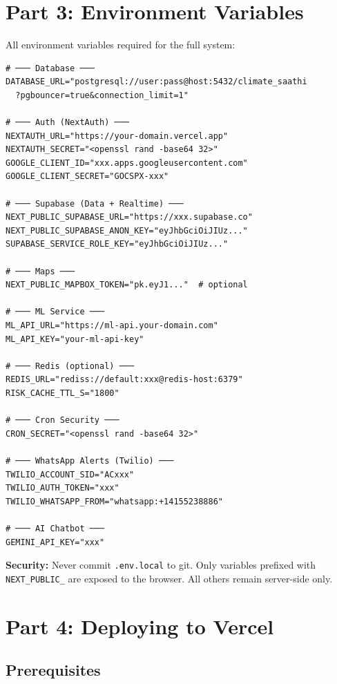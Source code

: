\documentclass[12pt,a4paper]{report}
\begin{document}
\chapter{Part 3: Environment Variables}

All environment variables required for the full system:

\begin{lstlisting}[caption={Complete .env.local reference}]
# ─── Database ───
DATABASE_URL="postgresql://user:pass@host:5432/climate_saathi
  ?pgbouncer=true&connection_limit=1"

# ─── Auth (NextAuth) ───
NEXTAUTH_URL="https://your-domain.vercel.app"
NEXTAUTH_SECRET="<openssl rand -base64 32>"
GOOGLE_CLIENT_ID="xxx.apps.googleusercontent.com"
GOOGLE_CLIENT_SECRET="GOCSPX-xxx"

# ─── Supabase (Data + Realtime) ───
NEXT_PUBLIC_SUPABASE_URL="https://xxx.supabase.co"
NEXT_PUBLIC_SUPABASE_ANON_KEY="eyJhbGciOiJIUz..."
SUPABASE_SERVICE_ROLE_KEY="eyJhbGciOiJIUz..."

# ─── Maps ───
NEXT_PUBLIC_MAPBOX_TOKEN="pk.eyJ1..."  # optional

# ─── ML Service ───
ML_API_URL="https://ml-api.your-domain.com"
ML_API_KEY="your-ml-api-key"

# ─── Redis (optional) ───
REDIS_URL="rediss://default:xxx@redis-host:6379"
RISK_CACHE_TTL_S="1800"

# ─── Cron Security ───
CRON_SECRET="<openssl rand -base64 32>"

# ─── WhatsApp Alerts (Twilio) ───
TWILIO_ACCOUNT_SID="ACxxx"
TWILIO_AUTH_TOKEN="xxx"
TWILIO_WHATSAPP_FROM="whatsapp:+14155238886"

# ─── AI Chatbot ───
GEMINI_API_KEY="xxx"
\end{lstlisting}

\begin{critbox}
\textbf{Security:} Never commit \texttt{.env.local} to git. Only variables prefixed with \texttt{NEXT\_PUBLIC\_} are exposed to the browser. All others remain server-side only.
\end{critbox}

\chapter{Part 4: Deploying to Vercel}

\section{Prerequisites}
\end{document}
